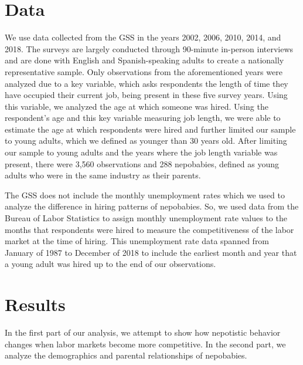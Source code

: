 \documentclass[12pt]{article}
\begin{document}
\iffalse
\section{Theoretical Analysis}
\label{sec:theory}
Optional--may include in intro if it's short.
\fi

\section{Data}
\label{sec:data}
We use data collected from the GSS in the years 2002, 2006, 2010, 2014, and 2018. The surveys are largely conducted through 90-minute in-person interviews and are done with English and Spanish-speaking adults to create a nationally representative sample. Only observations from the aforementioned years were analyzed due to a key variable, which asks respondents the length of time they have occupied their current job, being present in these five survey years. Using this variable, we analyzed the age at which someone was hired. Using the respondent's age and this key variable measuring job length, we were able to estimate the age at which respondents were hired and further limited our sample to young adults, which we defined as younger than 30 years old. After limiting our sample to young adults and the years where the job length variable was present, there were 3,560 observations and 288 nepobabies, defined as young adults who were in the same industry as their parents. 

The GSS does not include the monthly unemployment rates which we used to analyze the difference in hiring patterns of nepobabies. So, we used data from the Bureau of Labor Statistics to assign monthly unemployment rate values to the months that respondents were hired to measure the competitiveness of the labor market at the time of hiring. This unemployment rate data spanned from January of 1987 to December of 2018 to include the earliest month and year that a young adult was hired up to the end of our observations.


\section{Results}
\label{sec:result}

In the first part of our analysis, we attempt to show how nepotistic behavior changes when labor markets become more competitive. In the second part, we analyze the demographics and parental relationships of nepobabies.
\end{document}
